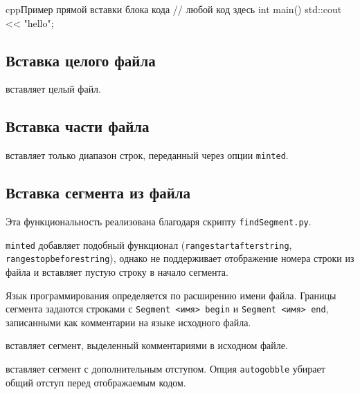 \documentclass[a4paper,12pt]{report}
\begin{document}
\begin{code}{cpp}{Пример прямой вставки блока кода}
// любой код здесь
int main()
{
    std::cout << "hello";
}
\end{code}

\subsection{Вставка целого файла}

 вставляет целый файл.


\subsection{Вставка части файла}

 вставляет только диапазон строк, переданный через опции \verb|minted|.


\subsection{Вставка сегмента из файла}

Эта функциональность реализована благодаря скрипту \texttt{findSegment.py}.

\verb|minted| добавляет подобный функционал (\verb|rangestartafterstring|, \verb|rangestopbeforestring|),
однако не поддерживает отображение номера строки из файла и вставляет пустую строку в начало сегмента.

Язык программирования определяется по расширению имени файла.
Границы сегмента задаются строками с \verb|Segment <имя> begin| и \verb|Segment <имя> end|,
записанными как комментарии на языке исходного файла.

 вставляет сегмент, выделенный комментариями в исходном файле.


 вставляет сегмент с дополнительным отступом.
Опция \verb|autogobble| убирает общий отступ перед отображаемым кодом.

\end{document}
